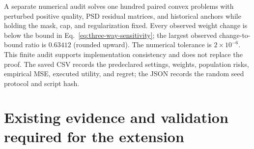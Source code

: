 
\begin{table}[htbp]
\centering\small
\caption{Newly executed known-moment threshold-decision verification. Entries are mean $\pm$ sample SD across twenty seeds. This is a controlled mechanism example, not an edge-service experiment.}
\label{tab:mechanism-verification}
\end{table}

A separate numerical audit solves one hundred paired convex problems with
perturbed positive quality, PSD residual matrices, and historical anchors while
holding the mask, cap, and regularization fixed. Every observed weight change
is below the bound in Eq.~\eqref{eq:three-way-sensitivity}; the largest observed
change-to-bound ratio is $0.63412$ (rounded upward). The numerical tolerance is
$2\times10^{-6}$. This finite audit supports implementation consistency and
does not replace the proof. The saved CSV records the predeclared settings,
weights, population risks, empirical MSE, executed utility, and regret; the JSON
records the random seed protocol and script hash.

\section{Existing evidence and validation required for the extension}
\label{sec:validation}


